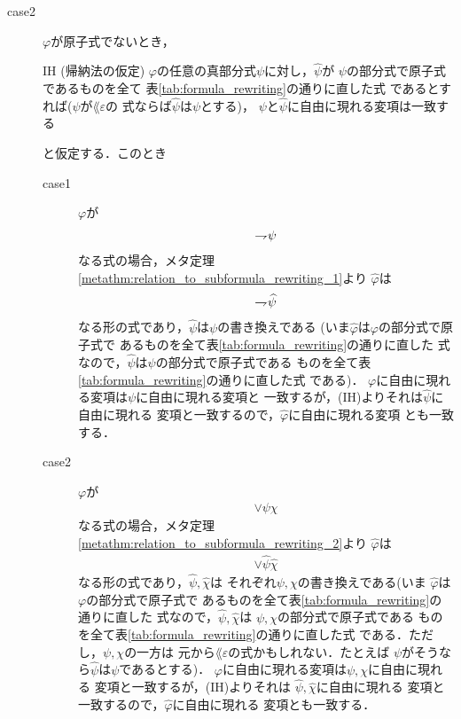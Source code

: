 \begin{metaprf}
\begin{description}
\begin{description}
					\item[case2] $\varphi$が原子式でないとき，
						\begin{itembox}[l]{IH (帰納法の仮定)}
							$\varphi$の任意の真部分式$\psi$に対し，$\widehat{\psi}$が
							$\psi$の部分式で原子式であるものを全て
							表\ref{tab:formula_rewriting}の通りに直した式
							であるとすれば($\psi$が$\lang{\varepsilon}$の
							式ならば$\widehat{\psi}$は$\psi$とする)，
							$\psi$と$\widehat{\psi}$に自由に現れる変項は一致する
						\end{itembox}
						と仮定する．このとき
						\begin{description}
							\item[case1] $\varphi$が
								\begin{align}
									\rightharpoondown\hspace{-0.25em} \psi
								\end{align}
								なる式の場合，メタ定理
								\ref{metathm:relation_to_subformula_rewriting_1}より
								$\widehat{\varphi}$は
								\begin{align}
									\rightharpoondown\hspace{-0.25em} \widehat{\psi}
								\end{align}
								なる形の式であり，$\widehat{\psi}$は$\psi$の書き換えである
								(いま$\widehat{\varphi}$は$\varphi$の部分式で原子式で
								あるものを全て表\ref{tab:formula_rewriting}の通りに直した
								式なので，$\widehat{\psi}$は$\psi$の部分式で原子式である
								ものを全て表\ref{tab:formula_rewriting}の通りに直した式
								である)．
								$\varphi$に自由に現れる変項は$\psi$に自由に現れる変項と
								一致するが，(IH)よりそれは$\widehat{\psi}$に自由に現れる
								変項と一致するので，$\widehat{\varphi}$に自由に現れる変項
								とも一致する．
						
							\item[case2] $\varphi$が
								\begin{align}
									\vee \psi \chi
								\end{align}
								なる式の場合，メタ定理
								\ref{metathm:relation_to_subformula_rewriting_2}より
								$\widehat{\varphi}$は
								\begin{align}
									\vee \widehat{\psi} \widehat{\chi}
								\end{align}
								なる形の式であり，$\widehat{\psi},\widehat{\chi}$は
								それぞれ$\psi,\chi$の書き換えである(いま
								$\widehat{\varphi}$は$\varphi$の部分式で原子式で
								あるものを全て表\ref{tab:formula_rewriting}の通りに直した
								式なので，$\widehat{\psi},\widehat{\chi}$は
								$\psi,\chi$の部分式で原子式である
								ものを全て表\ref{tab:formula_rewriting}の通りに直した式
								である．ただし，$\psi,\chi$の一方は
								元から$\lang{\varepsilon}$の式かもしれない．たとえば
								$\psi$がそうなら$\widehat{\psi}$は$\psi$であるとする)．
								$\varphi$に自由に現れる変項は$\psi,\chi$に自由に現れる
								変項と一致するが，(IH)よりそれは
								$\widehat{\psi},\widehat{\chi}$に自由に現れる
								変項と一致するので，$\widehat{\varphi}$に自由に現れる
								変項とも一致する．
					

\end{description}
\end{description}
\end{description}
\end{metaprf}
